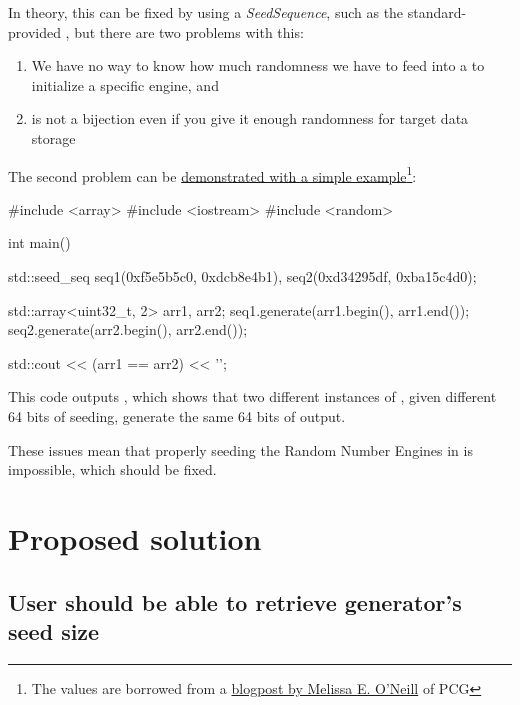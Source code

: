 \documentclass{wg21}
\begin{document}
In theory, this can be fixed by using a \emph{SeedSequence},
such as the standard-provided , but there are two
problems with this:

\begin{enumerate}

\item We have no way to know how much randomness we have to feed into
a  to initialize a specific engine, and

\item {} is not a bijection even if you give it enough
randomness for target data storage

\end{enumerate}

The second problem can be \href{https://godbolt.org/z/-SCJCI}
{demonstrated with a simple example}\footnote{The values are borrowed
from a \href{http://www.pcg-random.org/posts/cpp-seeding-surprises.html}
{blogpost by Melissa E. O'Neill} of PCG}:

\begin{codeblock}
#include <array>
#include <iostream>
#include <random>

int main() {
    std::seed_seq seq1({0xf5e5b5c0, 0xdcb8e4b1}),
                  seq2({0xd34295df, 0xba15c4d0});

    std::array<uint32_t, 2> arr1, arr2;
    seq1.generate(arr1.begin(), arr1.end());
    seq2.generate(arr2.begin(), arr2.end());

    std::cout << (arr1 == arr2) << '\n';
}
\end{codeblock}

This code outputs , which shows that two different instances
of , given different 64 bits of seeding, generate
the same 64 bits of output.

These issues mean that properly seeding the Random Number Engines in
 is impossible, which should be fixed.


\hypertarget{proposed-solution}{%
    \section{Proposed solution}\label{proposed-solution}}

\hypertarget{solution-1-give-randomness-size}{%
    \subsection{User should be able to retrieve generator's seed size}
\label{solution-1-give-randomness-size}}
\end{document}
